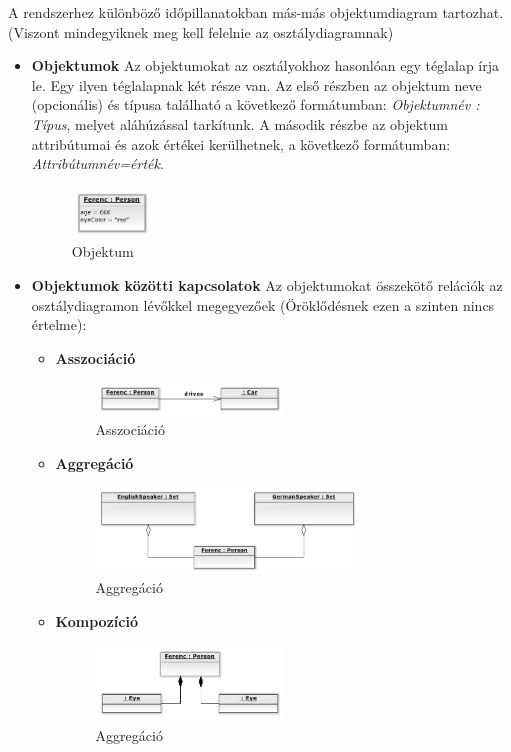 \documentclass[12pt,margin=0px]{article}
\begin{document}
        \noindent A rendszerhez különböző időpillanatokban más-más objektumdiagram tartozhat. (Viszont mindegyiknek meg kell felelnie az osztálydiagramnak)
			
        \begin{itemize}
		  \item \textbf{Objektumok}
            Az objektumokat az osztályokhoz hasonlóan egy téglalap írja le. Egy ilyen téglalapnak két része van. Az első részben az objektum neve (opcionális) és típusa található a következő formátumban: \textit{Objektumnév : Típus}, melyet aláhúzással tarkítunk. A második részbe az objektum attribútumai és azok értékei kerülhetnek, a következő formátumban: \textit{Attribútumnév=érték}.
			\begin{figure}[H]
				\centering
				\includegraphics[width=0.2\textwidth]{img/objektum.png}
				\caption{Objektum}
			\end{figure}
			\item \textbf{Objektumok közötti kapcsolatok}
				Az objektumokat összekötő relációk az osztálydiagramon lévőkkel megegyezőek (Öröklődésnek ezen a szinten nincs értelme):
				\begin{itemize}
					\item \textbf{Asszociáció}
						\begin{figure}[H]
							\centering
							\includegraphics[width=0.5\textwidth]{img/asszociacio2.png}
							\caption{Asszociáció}
						\end{figure}
						\item \textbf{Aggregáció}
							\begin{figure}[H]
								\centering
								\includegraphics[width=0.7\textwidth]{img/aggregacio2.png}
								\caption{Aggregáció}
							\end{figure}
						\item \textbf{Kompozíció}
							\begin{figure}[H]
								\centering
								\includegraphics[width=0.5\textwidth]{img/kompozicio2.png}
								\caption{Aggregáció}
							\end{figure}
						\end{itemize}
			\end{itemize}
\end{document}
